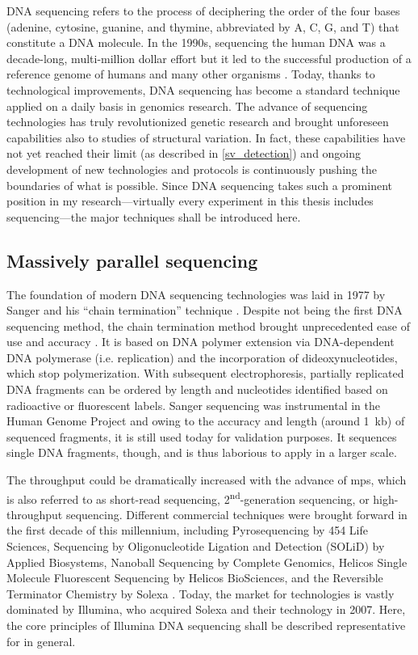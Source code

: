 DNA sequencing refers to the process of deciphering the order of the four bases
(adenine, cytosine, guanine, and thymine, abbreviated by A, C, G, and T) that
constitute a DNA molecule. In the 1990s, sequencing the human DNA was a
decade-long, multi-million dollar effort but it led to the successful production
of a reference genome of humans and many other organisms
\citep{Lander2001,Venter2001}. Today, thanks to technological improvements,
DNA sequencing has become a standard technique applied on a daily basis in
genomics research. The advance of sequencing technologies has truly
revolutionized genetic research and brought unforeseen capabilities also to
studies of structural variation. In fact, these capabilities have not yet
reached their limit (as described in \cref{sv_detection}) and ongoing
development of new technologies and protocols is continuously pushing the
boundaries of what is possible. Since DNA sequencing takes such a prominent
position in my research---virtually every experiment in this thesis includes
sequencing---the major techniques shall be introduced here.




\subsection{Massively parallel sequencing}
\label{sec:mps}

The foundation of modern DNA sequencing technologies was laid in 1977 by Sanger
and his ``chain termination'' technique \citep{Sanger1977}. Despite not being
the first DNA sequencing method, the chain termination method brought
unprecedented ease of use and accuracy \citep{Heather2016}. It is based on DNA
polymer extension via DNA-dependent DNA polymerase (i.e. replication) and the
incorporation of dideoxynucleotides, which stop polymerization. With subsequent
electrophoresis, partially replicated DNA fragments can be ordered by length and
nucleotides identified based on radioactive or fluorescent labels.
Sanger sequencing was instrumental in the Human Genome Project and owing to the
accuracy and length (around 1~kb) of sequenced fragments, it is still used
today for validation purposes. It sequences single DNA fragments, though, and
is thus laborious to apply in a larger scale.

The throughput could be dramatically increased with the advance of \acf{mps},
which is also referred to as short-read sequencing,
2\textsuperscript{nd}-generation sequencing, or high-throughput sequencing.
Different commercial techniques were brought forward in the first decade of this
millennium, including Pyrosequencing by 454 Life Sciences, Sequencing by
Oligonucleotide Ligation and Detection (SOLiD) by Applied Biosystems,
Nanoball Sequencing by Complete Genomics, Helicos Single Molecule Fluorescent
Sequencing by Helicos BioSciences, and the Reversible Terminator Chemistry by
Solexa \citep{wikiDNAseq2018}. Today, the market for \mps technologies is vastly
dominated by Illumina, who acquired Solexa and their technology in 2007. Here,
the core principles of Illumina DNA sequencing shall be described representative
for \mps in general.

